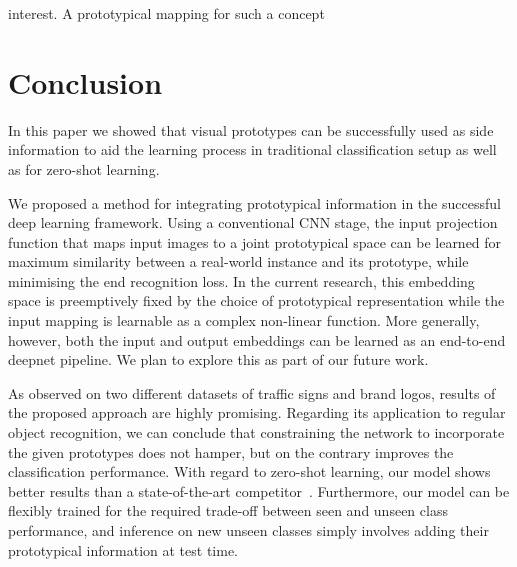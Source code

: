 \documentclass{bmvc2k}
\begin{document}
interest. A prototypical mapping for such a concept%

\section{\label{sec:Conclusion}Conclusion}

In this paper we showed that visual prototypes can be successfully used as side information 
to aid the learning process in traditional classification setup as well as for
zero-shot learning.

We proposed a method for integrating prototypical information in the
successful deep learning framework. Using a conventional CNN stage, the input projection
function that maps input images to a joint prototypical space can be learned for 
maximum similarity between a real-world instance and its prototype, while minimising the
end recognition loss. In the current research, this embedding space is
preemptively fixed by the choice of prototypical representation while the input mapping is
learnable as a complex non-linear function. More generally, however, both the
input and output embeddings can be learned as an end-to-end deepnet pipeline. We
plan to explore this as part of our future work.

As observed on two different datasets of traffic signs and brand logos, results
of the proposed approach are highly promising.
Regarding its application to regular object recognition, we can conclude that constraining the
network to incorporate the given prototypes does not hamper, but on the contrary
 improves the classification performance. With regard to zero-shot learning, our model shows better results than a state-of-the-art competitor~\cite{norouzi2013zero}. Furthermore,  
our model can be flexibly trained for the required trade-off between seen and unseen class performance, 
and inference on new unseen classes simply involves adding their prototypical
information at test time.
\end{document}
